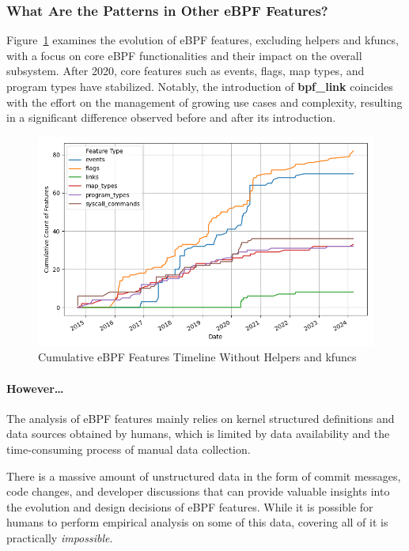 \subsubsection{What Are the Patterns in Other eBPF Features?}

Figure~\ref{fig:cumulative_without_helper_timeline} examines the evolution of eBPF features, excluding helpers and kfuncs, with a focus on core eBPF functionalities and their impact on the overall subsystem. After 2020, core features such as events, flags, map types, and program types have stabilized. Notably, the introduction of \textbf{bpf\_link} coincides with the effort on the management of growing use cases and complexity, resulting in a significant difference observed before and after its introduction.


\begin{figure}[ht]
    \centering
    \includegraphics[width=\linewidth]{feature-analysis/cumulative_bpf_features_timeline_no_helper_kfunc.png}
    \caption{Cumulative eBPF Features Timeline Without Helpers and kfuncs}
    \label{fig:cumulative_without_helper_timeline}
\end{figure}

\paragraph{However\ldots}

The analysis of eBPF features mainly relies on kernel structured definitions and data sources obtained by humans, which is limited by data availability and the time-consuming process of manual data collection.

There is a massive amount of unstructured data in the form of commit messages, code changes, and developer discussions that can provide valuable insights into the evolution and design decisions of eBPF features. While it is possible for humans to perform empirical analysis on some of this data, covering all of it is practically \emph{impossible}.

